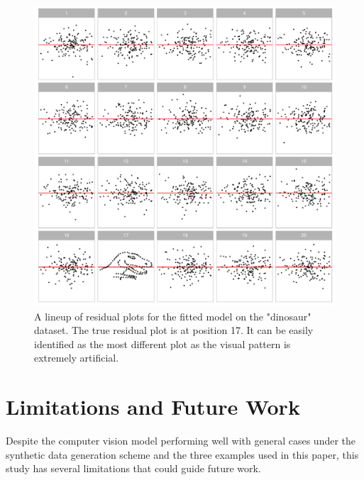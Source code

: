 \documentclass[]{interact}
\theoremstyle{plain}%
\theoremstyle{definition}
\theoremstyle{remark}
\begin{document}
\begin{figure}[!h]

{\centering \includegraphics[width=1\linewidth]{paper_files/figure-latex/dino-lineup-1} 

}

\caption{A lineup of residual plots for the fitted model on the "dinosaur" dataset. The true residual plot is at position 17. It can be easily identified as the most different plot as the visual pattern is extremely artificial.}\label{fig:dino-lineup}
\end{figure}

\section{Limitations and Future Work}\label{limitations-and-future-work}

Despite the computer vision model performing well with general cases
under the synthetic data generation scheme and the three examples used
in this paper, this study has several limitations that could guide
future work.
\end{document}
